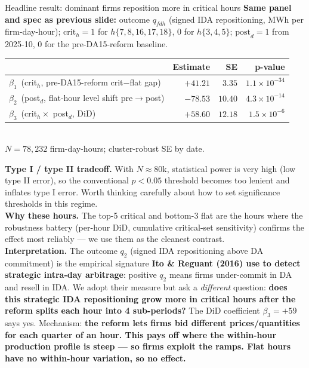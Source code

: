 \documentclass[10pt,aspectratio=169]{beamer}
\begin{document}
\begin{frame}{Headline result: dominant firms reposition more in critical hours}
  \footnotesize
  \textbf{Same panel and spec as previous slide:} outcome $q_{fdh}$ (signed IDA repositioning, MWh per firm-day-hour); $\text{crit}_h = 1$ for $h\{7,8,16,17,18\}$, $0$ for $h\{3,4,5\}$; $\text{post}_d = 1$ from 2025-10, $0$ for the pre-DA15-reform baseline.\\[3pt]
  \begin{center}
  \begin{tabular}{lrrr}
    \toprule
                                                                 & Estimate           & SE      & p-value \\
    \midrule
    $\beta_1$ \,(crit$_h$, pre-DA15-reform crit$-$flat gap)      & $+41.21$           & $3.35$  & $1.1\!\times\!10^{-34}$ \\
    $\beta_2$ \,(post$_d$, flat-hour level shift pre$\to$post)   & $-78.53$           & $10.40$ & $4.3\!\times\!10^{-14}$ \\
    $\beta_3$ \,(crit$_h \times$ post$_d$, DiD)                  & $\mathbf{+58.60}$  & $12.18$ & $1.5\!\times\!10^{-6}$  \\
    \bottomrule
  \end{tabular}\\[2pt]
  \footnotesize $N = 78{,}232$ firm-day-hours; cluster-robust SE by date.
  \end{center}
  \textbf{Type I / type II tradeoff.} With $N \approx 80\text{k}$, statistical power is very high (low type II error), so the conventional $p < 0.05$ threshold becomes too lenient and inflates type I error. Worth thinking carefully about how to set significance thresholds in this regime.\\[3pt]
  \textbf{Why these hours.} The top-5 critical and bottom-3 flat are the hours where the robustness battery (per-hour DiD, cumulative critical-set sensitivity) confirms the effect most reliably --- we use them as the cleanest contrast.\\[3pt]
  \textbf{Interpretation.} The outcome $q_2$ (signed IDA repositioning above DA commitment) is the empirical signature \textbf{Ito \& Reguant (2016) use to detect strategic intra-day arbitrage}: positive $q_2$ means firms under-commit in DA and resell in IDA. We adopt their measure but ask a \emph{different} question: \textbf{does this strategic IDA repositioning grow more in critical hours after the reform splits each hour into 4 sub-periods?} The DiD coefficient $\beta_3 = +59$ says yes. Mechanism: \textbf{the reform lets firms bid different prices/quantities for each quarter of an hour. This pays off where the within-hour production profile is steep --- so firms exploit the ramps. Flat hours have no within-hour variation, so no effect.}
\end{frame}
\end{document}
